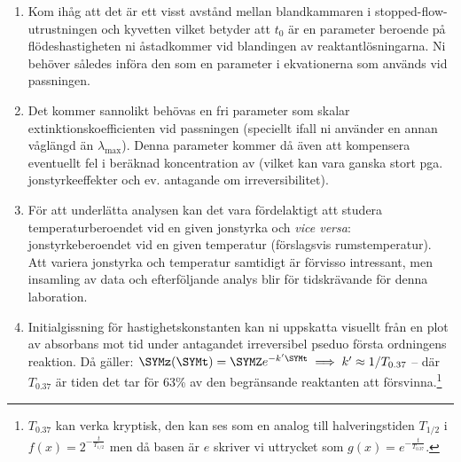 {\begin{enumerate}
\item Kom ihåg att det är ett visst
  avstånd mellan blandkammaren i stopped-flow-utrustningen och
  kyvetten vilket betyder att $t_0$ är en parameter beroende på
  flödeshastigheten ni åstadkommer vid blandingen av
  reaktantlösningarna. Ni behöver således införa den som en parameter i
  ekvationerna som används vid passningen.
\item Det kommer sannolikt behövas en fri parameter som skalar
  extinktionskoefficienten vid passningen (speciellt ifall ni använder en
  annan våglängd än $\lambda_\mathrm{max}$). Denna parameter kommer då även att
  kompensera eventuellt fel i beräknad koncentration av 
  (vilket kan vara ganska stort pga. jonstyrkeeffekter och ev. antagande
  om irreversibilitet).
\item För att underlätta analysen kan det vara fördelaktigt att studera
  temperaturberoendet vid en given jonstyrka och {\em vice versa}:
  jonstyrkeberoendet vid en given temperatur (förslagsvis
  rumstemperatur). Att variera jonstyrka och temperatur samtidigt är
  förvisso intressant, men insamling av data och efterföljande analys
  blir för tidskrävande för denna laboration.
\item Initialgissning för hastighetskonstanten kan ni uppskatta visuellt
  från en plot av absorbans mot tid under antagandet irreversibel pseduo
  första ordningens reaktion. Då gäller: $\SYMz(\SYMt) = \SYMZ e^{-k' \SYMt} \implies k'
  \approx 1/T_{0.37}$ -- där $T_{0.37}$ är tiden det tar för 63\% av den
  begränsande reaktanten att försvinna.\footnote{$T_{0.37}$ kan verka
    kryptisk, den kan ses som en analog till halveringstiden $T_{1/2}$ i
  $f(x)=2^{-\frac{t}{T_{1/2}}}$ men då basen är $e$ skriver vi uttrycket som $g(x)=e^{-\frac{t}{T_{0.37}}}$.}



\end{enumerate}
}
